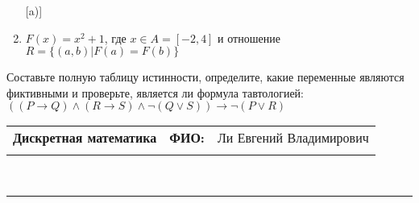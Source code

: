 \documentclass[10pt]{exam}
\newcommand{\class}{Дискретная математика}
\newcommand{\examdate}{}
\begin{document}
\begin{questions}
\begin{enumerate} [a)]
\item $F(x)=x^{2}+1$, где $x \in A = [-2, 4]$ и отношение $R = \{(a,b)|F(a) = F(b)\}$
\end{enumerate}\question Составьте полную таблицу истинности, определите, какие переменные являются фиктивными и проверьте, является ли формула тавтологией:
$((P \rightarrow Q) \land (R \rightarrow S) \land \neg (Q \lor S)) \rightarrow \neg (P \lor R)$

\end{questions}
\newpage
\begin{flushright}
\begin{tabular}{p{2.8in} r l}
\textbf{\class} & \textbf{ФИО:} &Ли Евгений Владимирович
\\

\textbf{\examdate} &&\\
\end{tabular}\\
\end{flushright}
\rule[1ex]{\textwidth}{.1pt}
\end{document}
